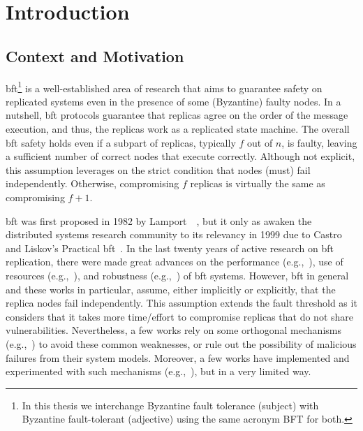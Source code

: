\chapter{Introduction}
\label{chap:introduction}

\section{Context and Motivation}
\gls{bft}\footnote{In this thesis we interchange Byzantine fault tolerance (subject) with Byzantine fault-tolerant (adjective) using the same acronym BFT for both.} is a well-established area of research that aims to guarantee safety on replicated systems even in the presence of some (Byzantine) faulty nodes.
In a nutshell, \gls{bft} protocols guarantee that replicas agree on the order of the message execution, and thus, the replicas work as a replicated state machine.
The overall \gls{bft} safety holds even if a subpart of replicas, typically $f$ out of $n$, is faulty, leaving a sufficient number of correct nodes that execute correctly.
Although not explicit, this assumption leverages on the strict condition that nodes (must) fail independently.
Otherwise, compromising $f$ replicas is virtually the same as compromising $f+1$.


\gls{bft} was first proposed in 1982 by Lamport~\etal{}~\cite{Lamport:1982}, but it only as awaken the distributed systems research community to its relevancy in 1999 due to Castro and Liskov's Practical \gls{bft}~\cite{Castro:1999}. 
In the last twenty years of active research on \gls{bft} replication, there were made great advances on the performance (e.g.,~\cite{Kotla:2010,Aublin:2015,Behl:2015}), use of resources (e.g.,~\cite{Yin:2003,Wood:2011,Veronese:2013,Liu:2016,Behl:2017}), and robustness (e.g.,~\cite{Amir:2011,Bessani:2014,Clement:2009b}) of \gls{bft} systems.
However, \gls{bft} in general and these works in particular, assume, either implicitly or explicitly, that the replica nodes fail independently. 
This assumption extends the fault threshold as it considers that it takes more time/effort to compromise replicas that do not share vulnerabilities.
Nevertheless, a few works rely on some orthogonal mechanisms (e.g.,~\cite{Roeder:2010,Avizienis:1995}) to avoid these common weaknesses, or rule out the possibility of malicious failures from their system models.
Moreover, a few works have implemented and experimented with such mechanisms (e.g.,~\cite{Castro:2003,Roeder:2010,Amir:2011}), but in a very limited way.


